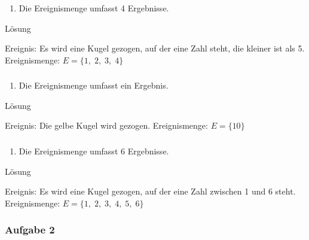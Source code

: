 \documentclass[
  ngerman,
]{book}
\providecommand{\tightlist}{%
  \setlength{\itemsep}{0pt}\setlength{\parskip}{0pt}}
\begin{document}
\begin{enumerate}
\def\labelenumi{\alph{enumi})}
\setcounter{enumi}{2}
\tightlist
\item
  Die Ereignismenge umfasst 4 Ergebnisse.
\end{enumerate}

Lösung

Ereignis: Es wird eine Kugel gezogen, auf der eine Zahl steht, die kleiner ist als 5. Ereignismenge: \(E=\{1,\;2,\;3,\;4\}\)

\hypertarget{section-53}{%
\subsubsection*{}\label{section-53}}

\begin{enumerate}
\def\labelenumi{\alph{enumi})}
\setcounter{enumi}{3}
\tightlist
\item
  Die Ereignismenge umfasst ein Ergebnis.
\end{enumerate}

Lösung

Ereignis: Die gelbe Kugel wird gezogen. Ereignismenge: \(E=\{10\}\)

\hypertarget{section-54}{%
\subsubsection*{}\label{section-54}}

\begin{enumerate}
\def\labelenumi{\alph{enumi})}
\setcounter{enumi}{4}
\tightlist
\item
  Die Ereignismenge umfasst 6 Ergebnisse.
\end{enumerate}

Lösung

Ereignis: Es wird eine Kugel gezogen, auf der eine Zahl zwischen 1 und 6 steht. Ereignismenge: \(E=\{1,\;2,\;3,\;4,\;5,\;6\}\)

\hypertarget{section-55}{%
\subsubsection*{}\label{section-55}}

\hypertarget{aufgabe-2-7}{%
\subsubsection*{Aufgabe 2}\label{aufgabe-2-7}}
\end{document}
